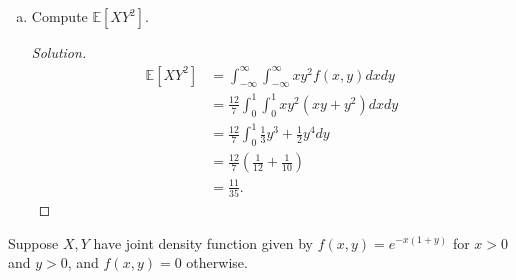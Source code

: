\documentclass[addpoints, 11pt]{exam}
\newcommand*{\E}{\mathds{E}}
\newenvironment{question}[1]{\smallskip\noindent\color{crimson}{\bf Question #1.}}{}
\begin{document}
\begin{enumerate}[(a)]
    \color{crimson}
    \item  Compute $\E[XY^2]$.
    \normalcolor
    
    \begin{proof}[Solution]
        \begin{align*}
            \E[XY^2]
            &= \int^{\infty}_{-\infty}\int^{\infty}_{-\infty} xy^2f(x, y) dxdy \\
            &= \frac{12}{7}\int^{1}_{0}\int^{1}_{0} xy^2(xy + y^2) dxdy \\
            &= \frac{12}{7}\int^{1}_{0} \frac{1}{3}y^3 + \frac{1}{2}y^4 dy \\
            &= \frac{12}{7}\left(\frac{1}{12} + \frac{1}{10}\right) \\
            &= \frac{11}{35}.
        \end{align*}
    \end{proof}
\end{enumerate}

\newpage

\begin{question}{3}
     Suppose $X,Y$ have joint density function given by $f(x, y) = e^{-x(1+y)}$ for $x > 0$ and $y > 0$, and $f(x, y) = 0$ otherwise.
\end{question}
\end{document}
